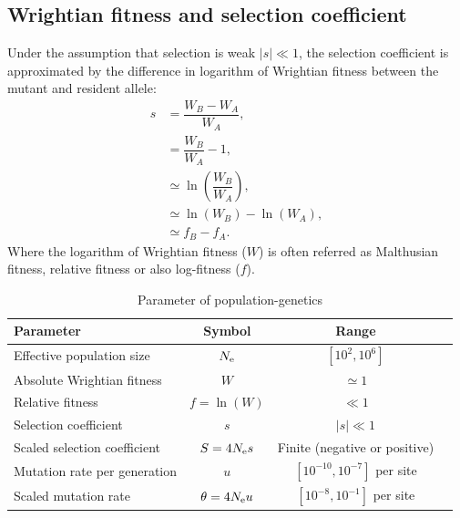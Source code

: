\subsection{Wrightian fitness and selection coefficient}

Under the assumption that selection is weak $|s| \ll 1$, the selection coefficient is approximated by the difference in logarithm of Wrightian fitness between the mutant and resident \gls{allele}:
\begin{align}
s & = \dfrac{W_{B} - W_{A}}{W_{A}}, \\
& = \dfrac{W_{B}}{W_{A}} - 1, \\
& \simeq \ln\left( \dfrac{W_{B}}{W_{A}} \right), \\
& \simeq \ln(W_{B}) - \ln(W_{A}), \\
& \simeq f_{B} - f_{A}.
\end{align}
Where the logarithm of Wrightian fitness ($W$) is often referred as Malthusian fitness, relative fitness or also log-fitness ($f$).

\begin{table}[H]
	\centering
	\begin{tabu}{|l|c|c|c|}
		\hline
		\textbf{Parameter} & \textbf{Symbol} & \textbf{Range} \\
		\hline \hline
		Effective population size & $N_{\textrm{e}}$ & $ [10^2, 10^6]$ \\
		\hline Absolute Wrightian fitness & $W$ & $ \simeq 1 $ \\
		\hline Relative fitness & $f=\ln(W)$ & $ \ll 1 $ \\
		\hline Selection coefficient & $s$ & $ |s| \ll 1 $ \\
		\hline Scaled selection coefficient & $S=4 N_{\textrm{e}} s$ & Finite (negative or positive) \\
		\hline Mutation rate per generation & $u$ & $[10^{-10}, 10^{-7}]$ per site \\
		\hline Scaled mutation rate & $\theta = 4 N_{\textrm{e}} u$ & $[10^{-8}, 10^{-1}]$ per site \\
		\hline
	\end{tabu}
	\caption[Parameter of population-genetics]{Parameter of population-genetics}\label{table:params-popgen}
\end{table}



